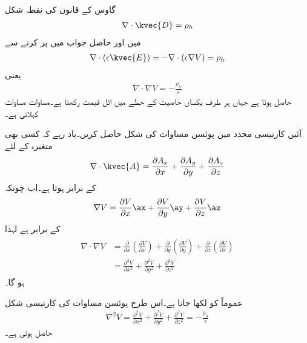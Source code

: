 گاوس کے قانون کی نقطہ شکل
\begin{align}
\nabla \cdot \kvec{D}=\rho_h
\end{align}
میں  اور حاصل جواب میں  پر کرنے سے
\begin{align*}
\nabla \cdot (\epsilon \kvec{E})=-\nabla \cdot (\epsilon \nabla V)=\rho_h 
\end{align*}
یعنی
\begin{align}\label{مساوات_پوئسن_نقطہ}
\nabla \cdot \nabla V=-\frac{\rho_h}{\epsilon}
\end{align}
حاصل ہوتا ہے  جہاں ہر طرف یکساں خاصیت کے خطے میں  اٹل قیمت رکھتا ہے۔مساوات   مساوات  کہلاتی ہے۔

آئیں کارتیسی محدد میں پوئسن مساوات کی شکل حاصل کریں۔یاد رہے کہ کسی بھی متغیرہ  کے لئے
\begin{align*}
\nabla \cdot \kvec{A}=\frac{\partial A_x}{\partial x}+\frac{\partial A_y}{\partial y}+\frac{\partial A_z}{\partial z}
\end{align*}  
کے برابر ہوتا ہے۔اب چونکہ
\begin{align*}
\nabla{V}=\frac{\partial V}{\partial x}\ax+\frac{\partial V}{\partial y}\ay+\frac{\partial V}{\partial z}\az
\end{align*}
 کے برابر ہے لہٰذا
\begin{gather}
\begin{aligned}
\nabla \cdot \nabla V&=\frac{\partial }{\partial x}\left(\frac{\partial V}{\partial x}\right)+\frac{\partial }{\partial y}\left(\frac{\partial V}{\partial y}\right)+\frac{\partial }{\partial z}\left(\frac{\partial V}{\partial z}\right)\\
&=\frac{\partial^2 V}{\partial x^2}+\frac{\partial^2 V}{\partial y^2}+\frac{\partial^2 V}{\partial z^2}
\end{aligned}
\end{gather}
 ہو گا۔

عموماً  کو  لکھا جاتا ہے۔اس طرح پوئسن مساوات کی کارتیسی شکل
\begin{align}\label{مساوات_لاپلاس_پوئسن_کارتیسی_شکل}
\nabla^2 V=\frac{\partial^2 V}{\partial x^2}+\frac{\partial^2 V}{\partial y^2}+\frac{\partial^2 V}{\partial z^2}=-\frac{\rho_h}{\epsilon}
\end{align}
حاصل ہوتی ہے۔ 

